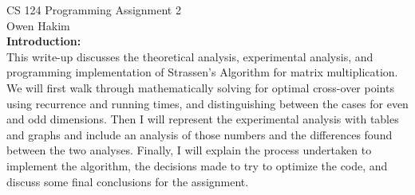 \documentclass[11pt]{article}
\begin{document}
CS 124 Programming Assignment 2 \\
\indent Owen Hakim
\\

\textbf{Introduction:}\\
This write-up discusses the theoretical analysis, experimental analysis, and programming implementation of Strassen's Algorithm for matrix multiplication. We will first walk through mathematically solving for optimal cross-over points using recurrence and running times, and distinguishing between the cases for even and odd dimensions. Then I will represent the experimental analysis with tables and graphs and include an analysis of those numbers and the differences found between the two analyses. Finally, I will explain the process undertaken to implement the algorithm, the decisions made to try to optimize the code, and discuss some final conclusions for the assignment. \\\\
\end{document}
